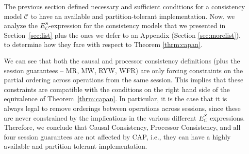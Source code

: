 \documentclass[conference]{IEEEtran}
\begin{document}
	The previous section defined necessary and sufficient conditions for
	a consistency model $\mathcal{C}$ to have an available and partition-tolerant
	implementation. Now, we analyze the $E^S_C$-expression for the consistency models that we presented in Section~\ref{sec:list} plus the ones we defer to an Appendix (Section \ref{sec:morelist}), to determine how they fare with respect to Theorem \ref{thrm:capan}.
	
	We can see that both the causal and processor consistency definitions (plus the session guarantees -- MR, MW, RYW, WFR) are only forcing constraints on the partial ordering across operations from the same session. This implies that these constraints are compatible with the conditions on the right hand side of the equivalence of Theorem~\ref{thrm:capan}. In particular, it is the case that it is always legal to remove orderings between operations across sessions, since these are never constrained by the implications in the various different $E^S_C$ expressions. Therefore, we conclude that Causal Consistency, Processor Consistency, and all four session guarantees are not affected by CAP, i.e., they can have a highly available and partition-tolerant implementation.
	
\end{document}
